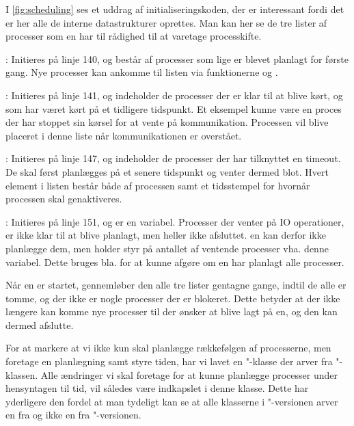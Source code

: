  I \cref{fig:scheduling} ses et uddrag af initialiseringskoden, der er interessant fordi det er her alle de interne datastrukturer oprettes. Man kan her se de  tre lister af processer som \sched en har til rådighed til at varetage processkifte. 
 \begin{list}
 \tightlist 
 \item {}: Initieres på linje 140, og består af processer som lige er blevet planlagt for første gang. Nye processer kan ankomme til listen  via funktionerne  og .
 \item {}: Initieres på linje 141, og indeholder de processer der er klar til at blive kørt, og som har været kørt på et tidligere tidspunkt. Et eksempel kunne være en proces der har stoppet sin kørsel for at vente på kommunikation. Processen vil blive placeret i denne liste når kommunikationen er overstået. 
 \item {}: Initieres på linje 147, og indeholder de processer der har tilknyttet en timeout. De skal først planlægges på et senere tidspunkt og venter dermed blot. Hvert element i listen består både af processen samt et tidsstempel for hvornår processen skal genaktiveres. 
 \item {}: Initieres på linje 151, og er en variabel. Processer der venter på IO operationer, er ikke klar til at blive planlagt, men heller ikke afsluttet. \Sched en kan derfor ikke planlægge dem, men holder styr på antallet af ventende processer vha. denne variabel. Dette bruges bla. for at kunne afgøre om \sched en har planlagt alle processer.
\end{list}

Når \sched en er startet, gennemløber den alle tre lister gentagne gange, indtil de alle er tomme, og der ikke er nogle processer der er blokeret. Dette betyder at der ikke længere kan komme nye processer til der ønsker at blive lagt på \sched en, og den kan dermed afslutte.

For at markere at vi ikke kun skal  planlægge rækkefølgen
af processerne, men foretage en planlægning samt styre tiden, har vi lavet en
"-klasse der arver fra "-klassen. Alle ændringer
vi skal foretage for at kunne planlægge processer under hensyntagen til tid, vil således være indkapslet i denne klasse. 
Dette har yderligere den fordel at man tydeligt kan se at alle klasserne i "-versionen arver en \sched fra  og
ikke en \sched \xspace fra "-versionen.


